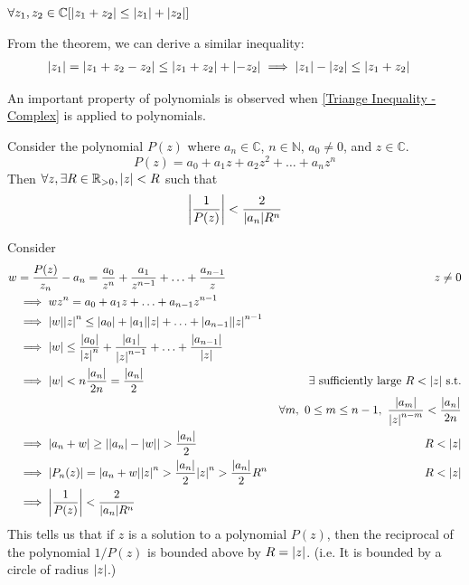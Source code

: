 \documentclass[12pt, english]{book}
\makeatletter
\renewenvironment{proof}[1][\proofname]{\par
	\pushQED{\qed}%
	\normalfont \topsep6\p@\@plus6\p@\relax
	\list{}{%
		\settowidth{\leftmargin}{\itshape\proofname:\hskip\labelsep}%
		\setlength{\labelwidth}{0pt}%
		\setlength{\itemindent}{-\leftmargin}%
	}%
	\item[\hskip\labelsep\itshape#1\@addpunct{:}]\ignorespaces
	}{ \popQED\endlist\@endpefalse}
\makeatother
\begin{document}
	\begin{theorem}
		$\forall z_1, z_2 \in \mathbb{C} [\abs{z_1 + z_2} \leq \abs{z_1} + \abs{z_2}]$
		\label{Triange Inequality - Complex}
	\end{theorem}
	
	From the theorem, we can derive a similar inequality: 
	\begin{align*}
		\abs{z_1} = \abs{z_1 + z_2 - z_2} \leq \abs{z_1 + z_2} + \abs{-z_2}
		 &\implies \abs{z_1} - \abs{z_2} \leq \abs{z_1 + z_2}
	\end{align*}
	
	An important property of polynomials is observed when \cref{Triange Inequality - Complex} is applied to polynomials.
	
	\begin{corollary}
		Consider the polynomial $P(z)$ where $a_n \in \mathbb{C}$, $n \in \mathbb{N}$, $a_0 \neq 0$, and $z \in \mathbb{C}$.
		$$P(z) = a_0 + a_1 z + a_2 z^2 + \ldots + a_n z^n$$
		Then $\forall z, \exists R \in \mathbb{R}_{>0}, \abs{z} < R$ such that
		$$\abs{\frac{1}{P(z)}} < \frac{2}{\abs{a_n} R^n}$$
		\label{Complex Poly Reciprocal Bounded Corollary - Complex}
	\end{corollary}
	\begin{proof}
		Consider 
		\begin{align*}
			w &= \frac{P(z)}{z_n} - a_n = \frac{a_0}{z^n} + \frac{a_1}{z^{n-1}} + \ldots + \frac{a_{n-1}}{z} 
				& z \neq 0 \\
			&\implies wz^n = a_0 + a_1 z + \ldots + a_{n-1}z^{n-1} \\
			&\implies \abs{w}\abs{z}^n \leq \abs{a_0} + \abs{a_1}\abs{z} + \ldots + \abs{a_{n-1}}\abs{z}^{n-1} \\
			&\implies \abs{w} \leq \frac{\abs{a_0}}{\abs{z}^n} + \frac{\abs{a_1}}{\abs{z}^{n-1}} + \ldots + \frac{\abs{a_{n-1}}}{\abs{z}} 
				& \\
			&\implies \abs{w} < n\frac{\abs{a_n}}{2n} = \frac{\abs{a_n}}{2} 
				& \exists \text{ sufficiently large } R < \abs{z}  \text{ s.t.}\\
			& 	& \forall m, \ 0 \leq m \leq n-1, \ \frac{\abs{a_m}}{\abs{z}^{n-m}} < \frac{\abs{a_n}}{2n} \\
			&\implies \abs{a_n + w} \geq \abs{\abs{a_n} - \abs{w}} > \frac{\abs{a_n}}{2}
				& R < \abs{z} \\
			&\implies \abs{P_n(z)} = \abs{a_n + w} \abs{z}^n > \frac{\abs{a_n}}{2}\abs{z}^n > \frac{\abs{a_n}}{2} R^n 
				& R < \abs{z} \\
			&\implies \abs{\frac{1}{P(z)}} < \frac{2}{\abs{a_n} R^n}
		\end{align*}
	\end{proof}
	This tells us that if $z$ is a solution to a polynomial $P(z)$, then the reciprocal of the polynomial $1/P(z)$ is bounded above by $R = \abs{z}$. (i.e. It is bounded by a circle of radius $\abs{z}$.)
	
\end{document}
